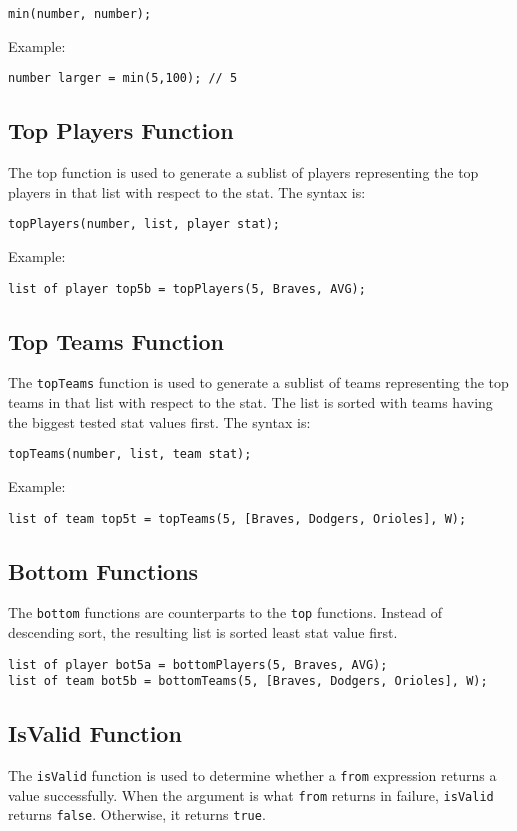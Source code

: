 \begin{verbatim}
min(number, number);
\end{verbatim}
Example: 
\begin{verbatim}
number larger = min(5,100); // 5
\end{verbatim}

\subsection{Top Players Function}
The top function is used to generate a sublist of players representing
the top players in that list with respect to the stat. The syntax is:

\begin{verbatim}
topPlayers(number, list, player stat);
\end{verbatim}
Example: 
\begin{verbatim}
list of player top5b = topPlayers(5, Braves, AVG);
\end{verbatim}

\subsection{Top Teams Function}
The \texttt{topTeams} function is used to generate a sublist of teams
representing the top teams in that list with respect to the stat. The
list is sorted with teams having the biggest tested stat values
first. The syntax is:

\begin{verbatim}
topTeams(number, list, team stat);
\end{verbatim}
Example: 
\begin{verbatim}
list of team top5t = topTeams(5, [Braves, Dodgers, Orioles], W);
\end{verbatim}

\subsection{Bottom Functions}
The \texttt{bottom} functions are counterparts to the \texttt{top}
functions. Instead of descending sort, the resulting list is sorted
least stat value first.

\begin{verbatim}
list of player bot5a = bottomPlayers(5, Braves, AVG);
list of team bot5b = bottomTeams(5, [Braves, Dodgers, Orioles], W);
\end{verbatim}

\subsection{IsValid Function}
The \texttt{isValid} function is used to determine whether a
\texttt{from} expression returns a value successfully. When the
argument is what \texttt{from} returns in failure, \texttt{isValid}
returns \texttt{false}. Otherwise, it returns \texttt{true}.

